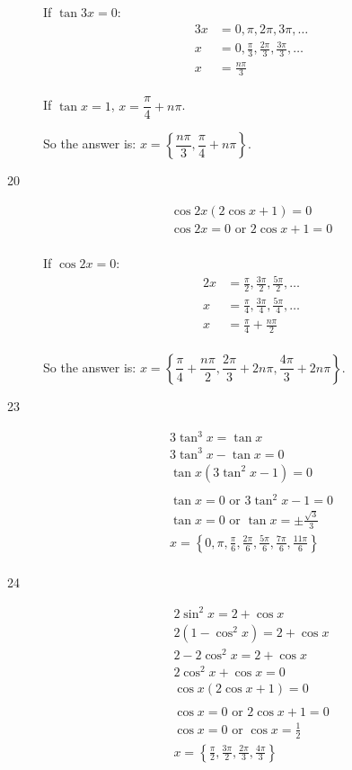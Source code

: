 \documentclass[fleqn,addpoints]{exam}
\begin{document}
\begin{description}
If $\tan 3x = 0$:
\begin{align*}
  3x &= 0, \pi, 2\pi, 3\pi, \ldots \\
  x &= 0, \frac{\pi}{3}, \frac{2\pi}{3}, \frac{3\pi}{3}, \ldots \\
  x &= \frac{n \pi}{3} \\
\end{align*}

If $\tan x = 1$, $x = \dfrac{\pi}{4} + n \pi$.

So the answer is: $x = \left\{ \dfrac{n \pi}{3}, \dfrac{\pi}{4} + n \pi \right\}$.

\item[20] 
\begin{align*}
  \cos 2x ( 2 \cos x + 1) = 0 \\ 
  \cos 2x = 0 \text{ or } 2 \cos x + 1 = 0 \\
\end{align*}

If $\cos 2x = 0$:
\begin{align*}
  2x &= \frac{\pi}{2}, \frac{3 \pi}{2}, \frac{5 \pi}{2}, \ldots \\
  x &= \frac{\pi}{4}, \frac{3 \pi}{4}, \frac{5 \pi}{4}, \ldots \\
  x &= \frac{\pi}{4} + \frac{n \pi}{2} \\
\end{align*}

So the answer is: $x = \left\{ \dfrac{\pi}{4} + \dfrac{n \pi}{2}, \dfrac{2 \pi}{3} + 2n\pi, \dfrac{4 \pi}{3} + 2n \pi \right\}$.

\item[23] 
\begin{align*}
  3 \tan^3 x = \tan x \\ 
  3 \tan^3 x - \tan x = 0 \\ 
  \tan x ( 3 \tan^2 x - 1) = 0 \\ 
  \\
  \tan x = 0 \text{ or } 3 \tan^2 x - 1 = 0 \\
  \tan x = 0 \text{ or } \tan x  = \pm \frac{\sqrt{3}}{3} \\
  x = \left\{ 0, \pi, \frac{\pi}{6}, \frac{2 \pi}{6}, \frac{5\pi}{6}, \frac{7 \pi}{6}, \frac{11 \pi}{6} \right\} \\
\end{align*}

\item[24] 
\begin{align*}
  2 \sin^2 x = 2 + \cos x \\ 
  2 (1 - \cos^2 x) = 2 + \cos x \\ 
  2 - 2\cos^2 x = 2 + \cos x \\ 
  2 \cos^2 x + \cos x = 0 \\
  \cos x(2 \cos x + 1) = 0 \\
  \\
  \cos x = 0 \text{ or } 2 \cos x + 1 = 0 \\
  \cos x = 0 \text{ or } \cos x  = \frac{1}{2} \\
  x = \left\{ \frac{\pi}{2}, \frac{3 \pi}{2}, \frac{2\pi}{3}, \frac{4 \pi}{3} \right\} \\
\end{align*}


\end{description}
\end{document}
